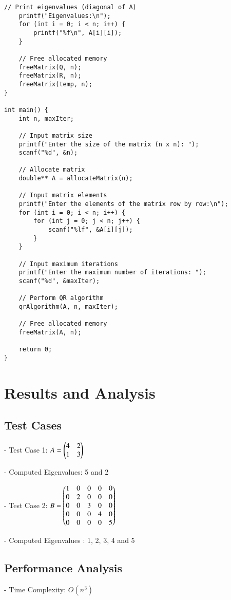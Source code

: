 \documentclass[journal]{IEEEtran}
\begin{document}
\begin{lstlisting}[caption={C code}]
    // Print eigenvalues (diagonal of A)
    printf("Eigenvalues:\n");
    for (int i = 0; i < n; i++) {
        printf("%f\n", A[i][i]);
    }

    // Free allocated memory
    freeMatrix(Q, n);
    freeMatrix(R, n);
    freeMatrix(temp, n);
}

int main() {
    int n, maxIter;

    // Input matrix size
    printf("Enter the size of the matrix (n x n): ");
    scanf("%d", &n);

    // Allocate matrix
    double** A = allocateMatrix(n);

    // Input matrix elements
    printf("Enter the elements of the matrix row by row:\n");
    for (int i = 0; i < n; i++) {
        for (int j = 0; j < n; j++) {
            scanf("%lf", &A[i][j]);
        }
    }

    // Input maximum iterations
    printf("Enter the maximum number of iterations: ");
    scanf("%d", &maxIter);

    // Perform QR algorithm
    qrAlgorithm(A, n, maxIter);

    // Free allocated memory
    freeMatrix(A, n);

    return 0;
}

\end{lstlisting}


\section{Results and Analysis}
\subsection{Test Cases}
- Test Case 1: $A = \begin{pmatrix} 4 & 2 \\ 1 & 3 \end{pmatrix}$

  - Computed Eigenvalues: 5 and 2
  
- Test Case 2: $B = \begin{pmatrix} 1 & 0 & 0 & 0 & 0 \\ 0 & 2 & 0 & 0 & 0 \\ 0 & 0 & 3 & 0 & 0 \\ 0 & 0 & 0 & 4 & 0 \\ 0 & 0 & 0 & 0 & 5 \end{pmatrix}$

- Computed Eigenvalues : 1, 2, 3, 4 and 5

\subsection{Performance Analysis}
- Time Complexity: $O(n^3)$
\end{document}

